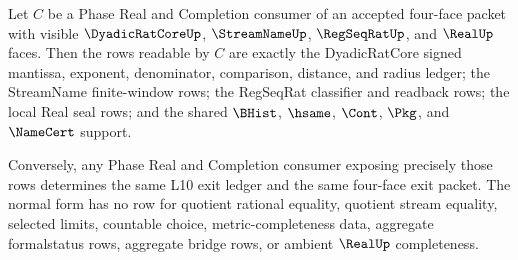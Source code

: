 \begin{theorem}
\label{thm:dyadicratcore-l10-exit-ledger-consumer-normal-form}
Let $C$ be a Phase Real and Completion consumer of an accepted four-face packet with visible $\DyadicRatCoreUp$, $\StreamNameUp$, $\RegSeqRatUp$, and $\RealUp$ faces. Then the rows readable by $C$ are exactly the DyadicRatCore signed mantissa, exponent, denominator, comparison, distance, and radius ledger; the StreamName finite-window rows; the RegSeqRat classifier and readback rows; the local Real seal rows; and the shared $\BHist$, $\hsame$, $\Cont$, $\Pkg$, and $\NameCert$ support.

Conversely, any Phase Real and Completion consumer exposing precisely those rows determines the same L10 exit ledger and the same four-face exit packet. The normal form has no row for quotient rational equality, quotient stream equality, selected limits, countable choice, metric-completeness data, aggregate formalstatus rows, aggregate bridge rows, or ambient $\RealUp$ completeness.
\end{theorem}
